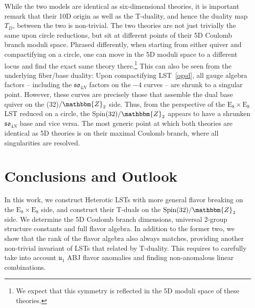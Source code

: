 \documentclass[11pt]{article}
\numberwithin{equation}{section}
\newcommand{\fu}{\mathfrak{u}}
\newcommand{\fso}{\mathfrak{so}}
\begin{document}
While the two models are identical as six-dimensional theories, it is important remark that their 10D origin as well as the T-duality, and hence the duality map $T_{D}$, between the two is non-trivial. The two theories are not just trivially the same upon circle reductions, but sit at different points of their 5D Coulomb branch moduli space. Phrased differently, when starting from either quiver and compactifying on a circle, one can move in the 5D moduli space to a different locus and find the exact same theory there.\footnote{We expect that this symmetry is reflected in the 5D moduli space of these theories.} This can also be seen from the underlying fiber/base duality: Upon compactifying LST~\eqref{ogsd}, all gauge algebra factors -- including the $\fso_{4N}$ factors on the $-4$ curves -- are shrunk to a singular point. However, these curves are precisely those that assemble the dual base quiver on the (32)$/\mathbbm{Z}_2$ side. Thus, from the perspective of the $\text{E}_8 \times \text{E}_8$ LST reduced on a circle, the Spin$(32)/\mathbbm{Z}_2$ appears to have a shrunken $\fso_{4N}$ base and vice versa. The most generic point at which both theories are identical as 5D theories is on their maximal Coulomb branch, where all singularities are resolved.


\section{Conclusions and Outlook}
\label{sec:conclusion}
In this work, we construct Heterotic LSTs with more general flavor breaking on the $\text{E}_8 \times \text{E}_8$ side, and construct their T-duals on the $\text{Spin}(32)/\mathbbm{Z}_2$ side. We determine the 5D Coulomb branch dimensions, universal 2-group structure constants and full flavor algebra. In addition to the former two, we show that the rank of the flavor algebra also always matches, providing another non-trivial invariant of LSTs that related by T-duality. This requires to carefully take into account $\fu_1$ ABJ flavor anomalies and finding non-anomalous linear combinations.
\end{document}
